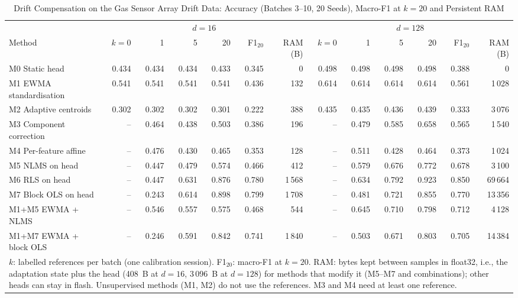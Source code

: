 \begin{table}[!t]
\caption{Drift Compensation on the Gas Sensor Array Drift Data: Accuracy (Batches 3--10, 20 Seeds), Macro-F1 at $k=20$ and Persistent RAM}
\label{tab:e2}\centering\footnotesize
\begin{tabular}{l rrrr r r @{\hspace{14pt}} rrrr r r}\toprule
 & \multicolumn{6}{c}{$d=16$} & \multicolumn{6}{c}{$d=128$}\\\cmidrule(lr){2-7}\cmidrule(lr){8-13}
Method & $k=0$ & 1 & 5 & 20 & F1$_{20}$ & RAM (B) & $k=0$ & 1 & 5 & 20 & F1$_{20}$ & RAM (B)\\\midrule
M0 Static head & 0.434 & 0.434 & 0.434 & 0.433 & 0.345 & 0 & 0.498 & 0.498 & 0.498 & 0.498 & 0.388 & 0\\
M1 EWMA standardisation & 0.541 & 0.541 & 0.541 & 0.541 & 0.436 & 132 & 0.614 & 0.614 & 0.614 & 0.614 & 0.561 & 1\,028\\
M2 Adaptive centroids & 0.302 & 0.302 & 0.302 & 0.301 & 0.222 & 388 & 0.435 & 0.435 & 0.436 & 0.439 & 0.333 & 3\,076\\
M3 Component correction & -- & 0.464 & 0.438 & 0.503 & 0.386 & 196 & -- & 0.479 & 0.585 & 0.658 & 0.565 & 1\,540\\
M4 Per-feature affine & -- & 0.476 & 0.430 & 0.465 & 0.353 & 128 & -- & 0.511 & 0.428 & 0.464 & 0.373 & 1\,024\\
M5 NLMS on head & -- & 0.447 & 0.479 & 0.574 & 0.466 & 412 & -- & 0.579 & 0.676 & 0.772 & 0.678 & 3\,100\\
M6 RLS on head & -- & 0.447 & 0.631 & 0.876 & 0.780 & 1\,568 & -- & 0.634 & 0.792 & 0.923 & 0.850 & 69\,664\\
M7 Block OLS on head & -- & 0.243 & 0.614 & 0.898 & 0.799 & 1\,708 & -- & 0.481 & 0.721 & 0.855 & 0.770 & 13\,356\\
M1+M5 EWMA + NLMS & -- & 0.546 & 0.557 & 0.575 & 0.468 & 544 & -- & 0.645 & 0.710 & 0.798 & 0.712 & 4\,128\\
M1+M7 EWMA + block OLS & -- & 0.246 & 0.591 & 0.842 & 0.741 & 1\,840 & -- & 0.503 & 0.671 & 0.803 & 0.705 & 14\,384\\
\bottomrule
\multicolumn{13}{p{0.95\textwidth}}{\scriptsize $k$: labelled references per batch (one calibration session). F1$_{20}$: macro-F1 at $k=20$. RAM: bytes kept between samples in float32, i.e., the adaptation state plus the head (408~B at $d=16$, 3\,096~B at $d=128$) for methods that modify it (M5--M7 and combinations); other heads can stay in flash. Unsupervised methods (M1, M2) do not use the references. M3 and M4 need at least one reference.}
\end{tabular}
\end{table}
